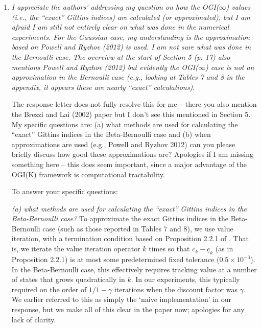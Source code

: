 \documentclass[11pt]{article}
\newcommand{\1}{\ensuremath{\mathbf{1}}} %
\theoremstyle{thm-sf}
\begin{document}
	
	\begin{enumerate}
		
		\item {\it I appreciate the authors’ addressing my question on how the OGI($\infty$) values (i.e., the “exact” Gittins indices) are calculated (or approximated), but I am afraid I am still not entirely clear on what was done in the numerical experiments. For the Gaussian case, my understanding is the approximation based on Powell and Ryzhov (2012) is used. I am not sure what was done in the Bernoulli case. The overview at the start of Section 5 (p. 17) also mentions Powell and Ryzhov (2012) but evidently the OGI($\infty$) case is not an approximation in the Bernoulli case (e.g., looking at Tables 7 and 8 in the appendix, it appears these are nearly “exact” calculations).
			
		The response letter does not fully resolve this for me – there you also mention the Brezzi and Lai (2002) paper but I don’t see this mentioned in Section 5. My specific questions are: (a) what methods are used for calculating the “exact” Gittins indices in the Beta-Bernoulli case and (b) when approximations are used (e.g., Powell and Ryzhov 2012) can you please briefly discuss how good these approximations are?
		Apologies if I am missing something here – this does seem important, since a major advantage of the OGI(K) framework is computational tractability.
		}

To answer your specific questions: 

{\em (a) what methods are used for calculating the “exact” Gittins indices in the Beta-Bernoulli case?} To approximate the exact Gittins indices in the Beta-Bernoulli case (such as those reported in Tables 7 and 8), we use value iteration, with a termination condition based on Proposition 2.2.1 of \cite{bertsekas2011dynamic}. That is, we iterate the value iteration operator $k$ times so that $\bar{c}_k - \underline{c}_k$ (as in Proposition 2.2.1) is at most some predetermined fixed tolerance ($0.5 \times 10^{-3}$). In the Beta-Bernoulli case, this effectively requires tracking value at a number of states that grows quadratically in $k$. In our experiments, this typically required on the order of $1/1-\gamma$ iterations when the discount factor was $\gamma$. We earlier referred to this as simply the `naive implementation' in our response, but we make all of this clear in the paper now; apologies for any lack of clarity. 



\end{enumerate}
\end{document}
